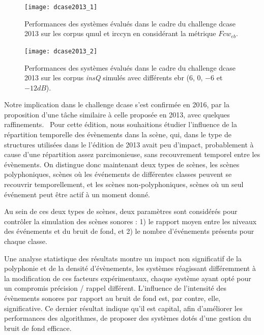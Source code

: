 \begin{figure}[t]
  \texttt{[image: dcase2013\_1]}
  \caption{Performances des systèmes évalués dans le cadre du challenge dcase 2013 sur les corpus qmul et irccyn en considérant la métrique $Fcw_{eb}$.}
  \label{fig:irccyn}
  \vspace{-4em}
\end{figure}

\begin{figure}[t]
  \begin{center}
    \texttt{[image: dcase2013\_2]}
    \caption{Performances des systèmes évalués dans le cadre du challenge dcase 2013 sur les corpus \emph{insQ} simulés avec différents ebr ($6$, $0$, $-6$ et $-12dB$).}
    \label{fig:ebr}
  \end{center}
  \vspace{-4em}
\end{figure}

Notre implication dans le challenge dcase s'est confirmée en 2016, par la proposition d'une tâche similaire à celle proposée en 2013, avec quelques raffinements.~\cite{mesa} Pour cette édition, nous souhaitions étudier l'influence de la répartition temporelle des évènements dans la scène, qui, dans le type de structures utilisées dans le l'édition de 2013 avait peu d'impact, probablement à cause d'une répartition assez parcimonieuse, sans recouvrement temporel entre les évènements. On distingue donc maintenant deux types de scènes, les scènes polyphoniques, scènes où les événements de différentes classes peuvent se recouvrir temporellement, et les scènes non-polyphoniques, scènes où un seul événement peut être actif à un moment donné.

Au sein de ces deux types de scènes, deux paramètres sont considérés pour contrôler la simulation des scènes sonores : 1) le rapport moyen entre les niveaux des événements et du bruit de fond, et 2) le nombre d'événements présents pour chaque classe.

Une analyse statistique des résultats\cite{lafayhal-01635414} montre un impact non significatif de la polyphonie et de la densité d'évènements, les systèmes réagissant différemment à la modification de ces facteurs expérimentaux, chaque système ayant opté pour un compromis précision / rappel différent. L'influence de l'intensité des évènements sonores par rapport au bruit de fond est, par contre, elle, significative. Ce dernier résultat indique qu'il est capital, afin d'améliorer les performances des algorithmes, de proposer des systèmes dotés d'une gestion du bruit de fond efficace.


